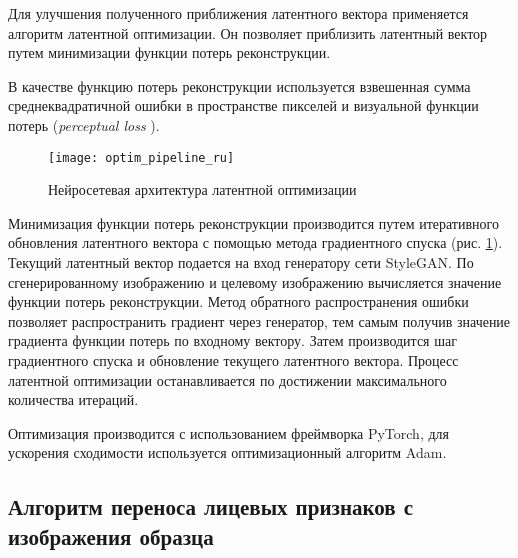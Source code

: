 Для улучшения полученного приближения латентного вектора применяется алгоритм латентной оптимизации. Он позволяет приблизить латентный вектор путем минимизации функции потерь реконструкции.

В качестве функцию потерь реконструкции используется взвешенная сумма среднеквадратичной ошибки в пространстве пикселей и визуальной функции потерь (\emph{perceptual loss} \cite{Johnson2016Perceptual}).

\begin{figure}[h]
\begin{center}
    \texttt{[image: optim\_pipeline\_ru]}
    \caption{Нейросетевая архитектура латентной оптимизации}
    \label{fig:optim_pipeline}
\end{center}
\end{figure}

Минимизация функции потерь реконструкции производится путем итеративного обновления латентного вектора с помощью метода градиентного спуска (рис. \ref{fig:optim_pipeline}).
Текущий латентный вектор подается на вход генератору сети StyleGAN.
По сгенерированному изображению и целевому изображению вычисляется значение функции потерь реконструкции. Метод обратного распространения ошибки позволяет распространить градиент через генератор, тем самым получив значение градиента функции потерь по входному вектору. Затем производится шаг градиентного спуска и обновление текущего латентного вектора.
Процесс латентной оптимизации останавливается по достижении максимального количества итераций.


Оптимизация производится с использованием фреймворка PyTorch, для ускорения сходимости используется оптимизационный алгоритм Adam.


\subsection{Алгоритм переноса лицевых признаков с изображения образца}

